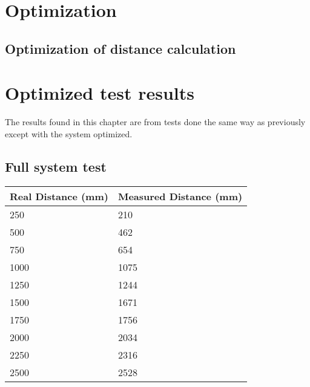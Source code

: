 \section{Optimization}
\subsection{Optimization of distance calculation}
\section{Optimized test results}
The results found in this chapter are from tests done the same way as previously except with the system optimized.
\subsection{Full system test}
\begin{table}[H]
\centering
    \begin{tabular}{|l|l|}
    \hline
    Real Distance (mm) & Measured Distance (mm) \\ \hline
    250                & 210                   \\ \hline
    500                & 462                    \\ \hline
    750                & 654                   \\ \hline
    1000               & 1075                   \\ \hline
    1250               & 1244                   \\ \hline
    1500               & 1671                   \\ \hline
    1750               & 1756                   \\ \hline
    2000               & 2034                   \\ \hline
    2250               & 2316                   \\ \hline
    2500               & 2528                   \\ \hline
    \end{tabular}
\end{table}
